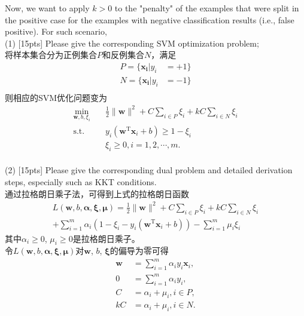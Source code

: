 \documentclass{article}
\begin{document}
    Now, we want to apply $k>0$ to the "penalty" of the examples that were split in the positive case for the examples with negative classification results (i.e., false positive). For such scenario,\\
   (1) [15pts] Please give the corresponding SVM optimization problem;\\
   将样本集合分为正例集合$P$和反例集合$N$，满足
   \begin{equation}
       \begin{aligned}
           P = \{\boldsymbol{x_i}|y_i &= +1\}\\
           N = \{\boldsymbol{x_i}|y_i &= -1\}\\
       \end{aligned}
   \end{equation}
   则相应的SVM优化问题变为
   \begin{equation}
    \begin{split}
        \min_{\boldsymbol{w},b,\xi_i}& \quad \frac{1}{2} \lVert \boldsymbol{w} \rVert^2 + C\sum_{i \in P}\xi_i + kC\sum_{i \in N}\xi_i\\
        \text{s.t.}&  \quad y_i(\boldsymbol{w}^\mathrm{T}\boldsymbol{x}_i + b)\geq 1-\xi_i\\
        & \quad \xi_i \geq 0, i = 1,2,\cdots,m.
    \end{split}
\end{equation}
   \\
   (2) [15pts] Please give the corresponding dual problem and detailed derivation steps, especially such as KKT conditions.\\
    通过拉格朗日乘子法，可得到上式的拉格朗日函数
    \begin{equation}
        \begin{split}
        L(\boldsymbol{w}, b, \boldsymbol{\alpha}, \boldsymbol{\xi}, \boldsymbol{\mu }) = 
        \frac{1}{2} \lVert \boldsymbol{w} \rVert^2 + C\sum_{i \in P}\xi_i + kC\sum_{i \in N}\xi_i\\
        +\sum_{i=1}^m \alpha_i (1-\xi_i-y_i(\boldsymbol{w}^\mathrm{T}\boldsymbol{x}_i+b))-\sum_{i=1}^m \mu_i \xi_i
        \end{split}
    \end{equation}
    其中$\alpha_i \geq 0$, $\mu_i \geq 0$是拉格朗日乘子。\\
    令$L(\boldsymbol{w}, b, \boldsymbol{\alpha}, \boldsymbol{\xi}, \boldsymbol{\mu })$对$\boldsymbol{w}$, $b$, $\boldsymbol{\xi}$的偏导为零可得
    \begin{align}
        \label{eq1}
        \boldsymbol{w} &= \sum_{i=1}^m \alpha_i y_i \boldsymbol{x}_i,\\
        \label{eq2}
        0 &= \sum_{i=1}^m \alpha_i y_i,\\
        \label{eq3}
        C &= \alpha_i + \mu_i, i \in P,\\
        \label{eq4}
        kC &= \alpha_i + \mu_i, i \in N.
    \end{align}
\end{document}
